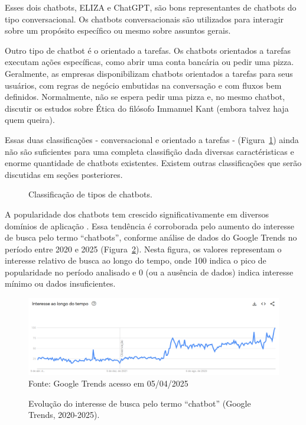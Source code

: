 \documentclass[a4paper,oneside]{book}
\begin{document}
Esses dois chatbots, ELIZA e ChatGPT, são bons representantes de chatbots do tipo conversacional. Os chatbots conversacionais são utilizados para interagir sobre um propósito específico ou mesmo sobre assuntos gerais.


 Outro tipo de chatbot é o orientado a tarefas. Os chatbots orientados a tarefas executam ações específicas, como abrir uma conta bancária ou pedir uma pizza. Geralmente, as empresas disponibilizam chatbots orientados a tarefas para seus usuários, com regras de negócio embutidas na conversação e com fluxos bem definidos. Normalmente, não se espera pedir uma pizza e, no mesmo chatbot, discutir os estudos sobre Ética do filósofo Immanuel Kant (embora talvez haja quem queira). 

Essas duas classificações - conversacional e orientado a tarefas - (Figura~\ref{fig:tipo}) ainda não são suficientes para uma completa classifição dada diversas caractéristicas e enorme quantidade de chatbots existentes. Existem outras classificações que serão discutidas em seções posteriores.

\begin{figure}
	\centering
	\caption{Classificação de tipos de chatbots.}
	\label{fig:tipo}
\end{figure}

A popularidade dos chatbots tem crescido significativamente em diversos domínios de aplicação \cite{B2020, Klopfenstein2017, Sharma2020}. Essa tendência é corroborada pelo aumento do interesse de busca pelo termo ``chatbots'', conforme análise de dados do Google Trends no período entre 2020 e 2025 (Figura~\ref{fig:trends}). Nesta figura, os valores representam o interesse relativo de busca ao longo do tempo, onde 100 indica o pico de popularidade no período analisado e 0 (ou a ausência de dados) indica interesse mínimo ou dados insuficientes.

\begin{figure}[!hbp]
	\centering
	\caption{Evolução do interesse de busca pelo termo ``chatbot'' (Google Trends, 2020-2025).}
	\includegraphics[width=1\linewidth]{fig/trends.png}
	\label{fig:trends}
	{\footnotesize Fonte: Google Trends acesso em 05/04/2025} %
\end{figure}
\end{document}
